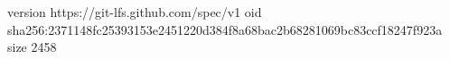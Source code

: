version https://git-lfs.github.com/spec/v1
oid sha256:2371148fc25393153e2451220d384f8a68bac2b68281069bc83ccf18247f923a
size 2458
